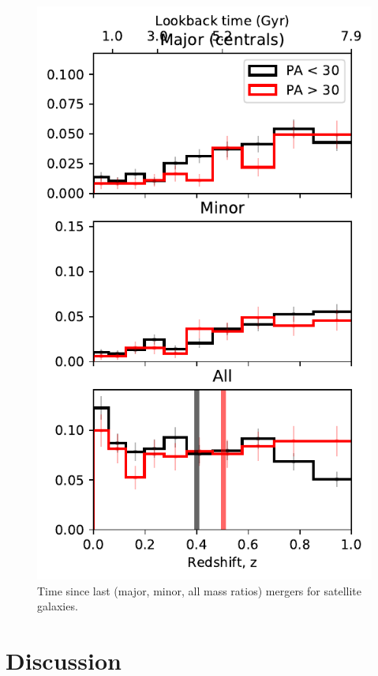 \documentclass[fleqn,usenatbib]{mnras}
\begin{document}
\begin{figure}
	\includegraphics[width=\linewidth]{tng_results/time_since_last_merger_satellites_PA_split.pdf}
    \caption{Time since last (major, minor, all mass ratios) mergers for satellite galaxies.}
    \label{fig:last_merger_sat}
\end{figure}

\section{Discussion}
\end{document}
